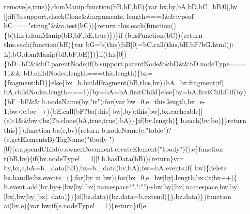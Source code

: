 \begin{DoxyCode}
{      remove}(e,\textcolor{keyword}{true})\},domManip:\textcolor{keyword}{function}(bB,bF,bE)\{var bx,by,bA,bD,bC=bB[0],bv=[];\textcolor{keywordflow}{if}(!b.support.checkClone&&arguments.
      length===3&&typeof bC===\textcolor{stringliteral}{"string"}&&o.test(bC))\{\textcolor{keywordflow}{return} this.each(\textcolor{keyword}{function}()\{b(\textcolor{keyword}{this}).domManip(bB,bF,bE,\textcolor{keyword}{true})\})\}\textcolor{keywordflow}{if}
      (b.isFunction(bC))\{\textcolor{keywordflow}{return} this.each(\textcolor{keyword}{function}(bH)\{var bG=b(\textcolor{keyword}{this});bB[0]=bC.call(\textcolor{keyword}{this},bH,bF?bG.html():
      L);bG.domManip(bB,bF,bE)\})\}\textcolor{keywordflow}{if}(\textcolor{keyword}{this}[0])\{bD=bC&&bC.parentNode;\textcolor{keywordflow}{if}(b.support.parentNode&&bD&&bD.nodeType===11&&
      bD.childNodes.length===\textcolor{keyword}{this}.length)\{bx=\{fragment:bD\}\}\textcolor{keywordflow}{else}\{bx=b.buildFragment(bB,\textcolor{keyword}{this},bv)\}bA=bx.fragment;\textcolor{keywordflow}{if}(
      bA.childNodes.length===1)\{by=bA=bA.firstChild\}\textcolor{keywordflow}{else}\{by=bA.firstChild\}\textcolor{keywordflow}{if}(by)\{bF=bF&&
      b.nodeName(by,\textcolor{stringliteral}{"tr"});\textcolor{keywordflow}{for}(var bw=0,e=this.length,bz=e-1;bw<e;bw++)\{bE.call(bF?ba(\textcolor{keyword}{this}[
      bw],by):\textcolor{keyword}{this}[bw],bx.cacheable||(e>1&&bw<bz)?b.clone(bA,\textcolor{keyword}{true},\textcolor{keyword}{true}):bA)\}\}\textcolor{keywordflow}{if}(bv.length)\{
      b.each(bv,bo)\}\}\textcolor{keywordflow}{return} \textcolor{keyword}{this}\}\});\textcolor{keyword}{function} ba(e,bv)\{\textcolor{keywordflow}{return} b.nodeName(e,\textcolor{stringliteral}{"table"})?(e.getElementsByTagName(\textcolor{stringliteral}{"tbody
      "})[0]||e.appendChild(e.ownerDocument.createElement(\textcolor{stringliteral}{"tbody"}))):e\}\textcolor{keyword}{function} t(bB,bv)\{\textcolor{keywordflow}{if}(bv.nodeType!==1||!
      b.hasData(bB))\{\textcolor{keywordflow}{return}\}var by,bx,e,bA=b.\_data(bB),bz=b.\_data(bv,bA),bw=bA.events;\textcolor{keywordflow}{if}(
      bw)\{\textcolor{keyword}{delete} bz.handle;bz.events=\{\};\textcolor{keywordflow}{for}(by in bw)\{\textcolor{keywordflow}{for}(bx=0,e=bw[by].length;bx<e;bx++)\{
      b.event.add(bv,by+(bw[by][bx].\textcolor{keyword}{namespace}?\textcolor{stringliteral}{"."}:\textcolor{stringliteral}{""})+bw[by][bx].\textcolor{keyword}{namespace},bw[by][bx],bw[by][bx].
      data)\}\}\}\textcolor{keywordflow}{if}(bz.data)\{bz.data=b.extend(\{\},bz.data)\}\}\textcolor{keyword}{function} ai(bv,e)\{var bw;\textcolor{keywordflow}{if}(e.nodeType!==1)\{\textcolor{keywordflow}{return}\}\textcolor{keywordflow}{if}(e.

\end{DoxyCode}
